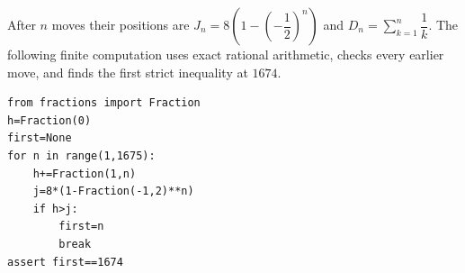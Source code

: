 After $n$ moves their positions are $J_n=8(1-(-\dfrac{1}{2})^n)$ and $D_n=\sum_{k=1}^n\dfrac{1}{k}$. The following finite computation uses exact rational arithmetic, checks every earlier move, and finds the first strict inequality at $\boxed{1674}$.
\begin{verbatim}
from fractions import Fraction
h=Fraction(0)
first=None
for n in range(1,1675):
    h+=Fraction(1,n)
    j=8*(1-Fraction(-1,2)**n)
    if h>j:
        first=n
        break
assert first==1674
\end{verbatim}
